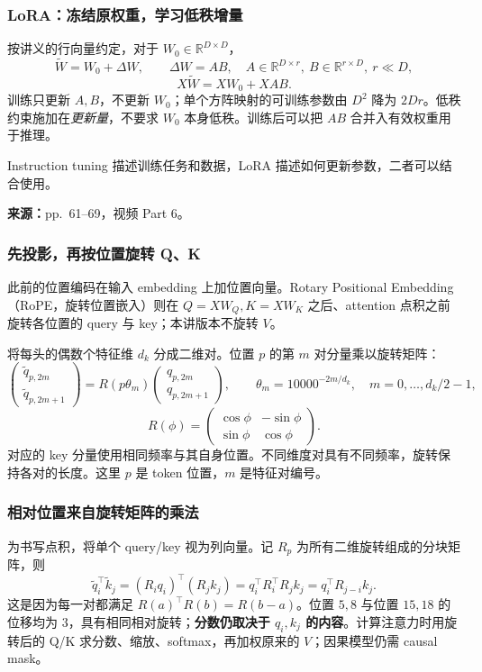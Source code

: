 \subsubsection{LoRA：冻结原权重，学习低秩增量}

按讲义的行向量约定，对于 $W_0\in\mathbb R^{D\times D}$，
\[
 \widetilde W=W_0+\Delta W,\qquad
 \Delta W=AB,\quad A\in\mathbb R^{D\times r},\ B\in\mathbb R^{r\times D},\ r\ll D,
\]
\[
 X\widetilde W=XW_0+XAB.
\]
训练只更新 $A,B$，不更新 $W_0$；单个方阵映射的可训练参数由 $D^2$ 降为 $2Dr$。低秩约束施加在\emph{更新量}，不要求 $W_0$ 本身低秩。训练后可以把 $AB$ 合并入有效权重用于推理。

Instruction tuning 描述训练任务和数据，LoRA 描述如何更新参数，二者可以结合使用。


\textbf{来源：}pp.~61--69，视频 Part 6。

\subsubsection{先投影，再按位置旋转 Q、K}

此前的位置编码在输入 embedding 上加位置向量。Rotary Positional Embedding（RoPE，旋转位置嵌入）则在 $Q=XW_Q,K=XW_K$ 之后、attention 点积之前旋转各位置的 query 与 key；本讲版本不旋转 $V$。

将每头的偶数个特征维 $d_k$ 分成二维对。位置 $p$ 的第 $m$ 对分量乘以旋转矩阵：
\[
 \begin{pmatrix}\widetilde q_{p,2m}\\\widetilde q_{p,2m+1}\end{pmatrix}
 =R(p\theta_m)\begin{pmatrix}q_{p,2m}\\q_{p,2m+1}\end{pmatrix},\qquad
 \theta_m=10000^{-2m/d_k},\quad m=0,\ldots,d_k/2-1,
\]
\[
 R(\phi)=\begin{pmatrix}\cos\phi&-\sin\phi\\\sin\phi&\cos\phi\end{pmatrix}.
\]
对应的 key 分量使用相同频率与其自身位置。不同维度对具有不同频率，旋转保持各对的长度。这里 $p$ 是 token 位置，$m$ 是特征对编号。

\subsubsection{相对位置来自旋转矩阵的乘法}

为书写点积，将单个 query/key 视为列向量。记 $R_p$ 为所有二维旋转组成的分块矩阵，则
\[
 \widetilde q_i^\top\widetilde k_j
 =(R_iq_i)^\top(R_jk_j)
 =q_i^\top R_i^\top R_jk_j
 =q_i^\top R_{j-i}k_j.
\]
这是因为每一对都满足 $R(a)^\top R(b)=R(b-a)$。位置 $5,8$ 与位置 $15,18$ 的位移均为 $3$，具有相同相对旋转；\textbf{分数仍取决于 $q_i,k_j$ 的内容}。计算注意力时用旋转后的 Q/K 求分数、缩放、softmax，再加权原来的 $V$；因果模型仍需 causal mask。

